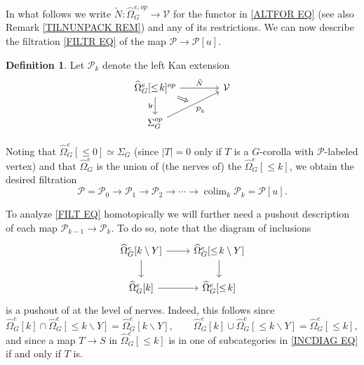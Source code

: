 \documentclass[a4paper,10pt
,draft
]{article}%
\numberwithin{equation}{section}
\numberwithin{figure}{section}
\theoremstyle{definition} %
\newtheorem{definition}[equation]{Definition}%
\DeclareMathOperator{\colim}{colim}%
\newcommand{\V}{\ensuremath{\mathcal V}}
\renewcommand{\P}{\ensuremath{\mathcal P}}
\newcommand{\1}{\ensuremath{\mathbbm 1}}%
\begin{document}
In what follows we write $\tilde{N} \colon \widehat{\Omega}_G^{e,op} \to \mathcal{V}$ for the functor in \eqref{ALTFOR EQ}
(see also Remark \ref{TILNUNPACK REM})
and any of its restrictions.
%
We can now describe the filtration \eqref{FILTR EQ}
of the map $\mathcal{P} \to \mathcal{P}[u]$.

\begin{definition} \label{PK_DEFN}
  Let $\P_k$ denote the left Kan extension
\[
\begin{tikzcd}[column sep =4em]
	|[alias=U]| \widehat{\Omega}_G^e[\leq\! k]^{op} \arrow[r, "\tilde{N}"] \arrow[d, "\mathsf{lr}"'] & \V
\\
	\Sigma_G^{op} \arrow[ur, "\P_k"', ""{name=V}]
	\arrow[Rightarrow, from=U, to=V]
\end{tikzcd}
\]
\end{definition}
Noting that $\widehat{\Omega}_G^e[\leq\! 0] \simeq \Sigma_G$
(since $|T|=0$ only if $T$ is a $G$-corolla with $\mathcal{P}$-labeled vertex)
and that $\widehat{\Omega}_G^e$
is the union of (the nerves of) the 
$\widehat{\Omega}_G^e[\leq\! k]$,
we obtain the desired filtration
\begin{equation}\label{FILT EQ}
	\mathcal{P} = 
	\mathcal{P}_0 \to 
	\mathcal{P}_1 \to
	\mathcal{P}_2 \to
	\cdots \to 
	\colim_k \mathcal{P}_k = \mathcal{P}[u].
\end{equation}

To analyze \eqref{FILT EQ} homotopically we will further need a pushout description of each map 
$\mathcal{P}_{k-1} \to \mathcal{P}_k$. To do so,  note that the diagram of inclusions
\begin{equation}\label{INCDIAG EQ}
\begin{tikzcd}
	\widehat{\Omega}_G^{e}[k \mathbin{\backslash} Y]
	\arrow[d] \arrow[r] &
	\widehat{\Omega}_G^{e}[\leq\! k \mathbin{\backslash} Y]
	\arrow[d]
\\
	\widehat{\Omega}_G^e[k] \arrow[r] &
	\widehat{\Omega}_G^e[\leq\! k]
\end{tikzcd}
\end{equation}
is a pushout of at the level of nerves.
Indeed, this follows since
\[
	\widehat{\Omega}_G^e[k] \cap
	\widehat{\Omega}_G^{e}[\leq\! k \mathbin{\backslash} Y]
	= \widehat{\Omega}_G^{e}[k \mathbin{\backslash} Y],
\qquad
	\widehat{\Omega}_G^e[k] \cup 
	\widehat{\Omega}_G^{e}[\leq\! k\mathbin{\backslash} Y]
	= \widehat{\Omega}_G^{e}[\leq\! k],
\]
and since a map $T \to S$ in 
$\widehat{\Omega}_G^e[\leq\! k]$ is in one of subcategories in \eqref{INCDIAG EQ} if and only if $T$ is.
\end{document}
